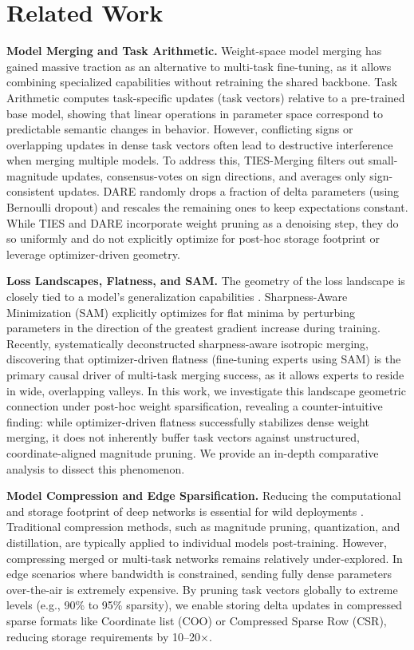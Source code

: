 \section{Related Work}
\label{submission:sec:related}

\textbf{Model Merging and Task Arithmetic.} Weight-space model merging has gained massive traction as an alternative to multi-task fine-tuning, as it allows combining specialized capabilities without retraining the shared backbone. Task Arithmetic \cite{ilharco2022editing} computes task-specific updates (task vectors) relative to a pre-trained base model, showing that linear operations in parameter space correspond to predictable semantic changes in behavior. However, conflicting signs or overlapping updates in dense task vectors often lead to destructive interference when merging multiple models. To address this, TIES-Merging \cite{yadav2023ties} filters out small-magnitude updates, consensus-votes on sign directions, and averages only sign-consistent updates. DARE \cite{yu2023language} randomly drops a fraction of delta parameters (using Bernoulli dropout) and rescales the remaining ones to keep expectations constant. While TIES and DARE incorporate weight pruning as a denoising step, they do so uniformly and do not explicitly optimize for post-hoc storage footprint or leverage optimizer-driven geometry.

\textbf{Loss Landscapes, Flatness, and SAM.} The geometry of the loss landscape is closely tied to a model's generalization capabilities \cite{foret2021sharpness}. Sharpness-Aware Minimization (SAM) explicitly optimizes for flat minima by perturbing parameters in the direction of the greatest gradient increase during training. Recently, \citet{saim2024deconstructing} systematically deconstructed sharpness-aware isotropic merging, discovering that optimizer-driven flatness (fine-tuning experts using SAM) is the primary causal driver of multi-task merging success, as it allows experts to reside in wide, overlapping valleys. In this work, we investigate this landscape geometric connection under post-hoc weight sparsification, revealing a counter-intuitive finding: while optimizer-driven flatness successfully stabilizes dense weight merging, it does not inherently buffer task vectors against unstructured, coordinate-aligned magnitude pruning. We provide an in-depth comparative analysis to dissect this phenomenon.

\textbf{Model Compression and Edge Sparsification.} Reducing the computational and storage footprint of deep networks is essential for wild deployments \cite{han2015learning, chmiel2020robust}. Traditional compression methods, such as magnitude pruning, quantization, and distillation, are typically applied to individual models post-training. However, compressing merged or multi-task networks remains relatively under-explored. In edge scenarios where bandwidth is constrained, sending fully dense parameters over-the-air is extremely expensive. By pruning task vectors globally to extreme levels (e.g., 90\% to 95\% sparsity), we enable storing delta updates in compressed sparse formats like Coordinate list (COO) or Compressed Sparse Row (CSR), reducing storage requirements by 10--20$\times$.

